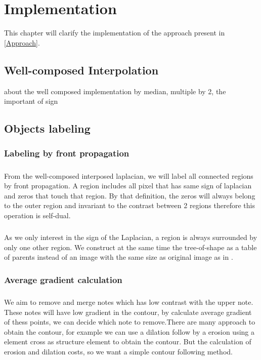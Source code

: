 
\graphicspath{ {2ChapterImplementation/image/} }
\chapter{Implementation}

This chapter will clarify the implementation of the approach present in \autoref{Approach}.

\section{Well-composed Interpolation}

about the well composed implementation by median, multiple by 2, the important of sign

\section{Objects labeling}

\subsection{Labeling by front propagation}
\paragraph{} From the well-composed interposed laplacian, we will label all connected regions by front propagation. A region includes all pixel that has same sign of laplacian and zeros that touch that region. By that definition, the zeros will always belong to the outer region and invariant to the contrast between 2 regions therefore this operation is self-dual. 
\paragraph{}As we only interest in the sign of the Laplacian, a region is always surrounded by only one other region. We construct at the same time the tree-of-shape as a table of parents instead of an image with the same size as original image as in \cite{geraud.13.ismm}. 

\subsection{Average gradient calculation}
\paragraph{} We aim to remove and merge notes which has low contrast with the upper note. These notes will have low gradient in the contour, by calculate average gradient of thess points, we can decide which note to remove.There are many approach to obtain the contour, for example we can use a dilation follow by a erosion using a element cross as structure element to obtain the contour. But the calculation of erosion and dilation costs, so we want a simple contour following method. 
